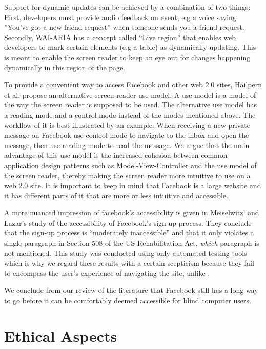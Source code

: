 \documentclass[conference]{IEEEtran}
\begin{document}
Support for dynamic updates can be achieved by a combination of two things\cite{hailpern2009}: First, developers must provide audio feedback on event, e.g a voice saying ''You've got a new friend request'' when someone sends you a friend request. Secondly, WAI-ARIA has a concept called ``Live region''\cite{ariaspec} that enables web developers to mark certain elements (e.g a table) as dynamically updating. This is meant to enable the screen reader to keep an eye out for changes happening dynamically in this region of the page.

To provide a convenient way to access Facebook and other web 2.0 sites, Hailpern et al\cite{hailpern2009}. propose an alternative screen reader use model. A use model is a model of the way the screen reader is supposed to be used. The alternative use model has a reading mode and a control mode instead of the modes mentioned above. The workflow of it is best illustrated by an example: When receiving a new private message on Facebook use control mode to navigate to the inbox and open the message, then use reading mode to read the message. We argue that the main advantage of this use model is the increased cohesion between common application design patterns such as Model-View-Controller and the use model of the screen reader, thereby making the screen reader more intuitive to use on a web 2.0 site. It is important to keep in mind that Facebook is a large website and it has different parts of it that are more or less intuitive and accessible.

A more nuanced impression of facebook's accessibility is given in Meiselwitz' and Lazar's \cite{meiselwitz2009} study of the accessibility of Facebook's sign-up process. They conclude that the sign-up process is ``moderately inaccessible'' and that it only violates a single paragraph in Section 508 of the US Rehabilitation Act, \emph{which} paragraph is not mentioned. This study was conducted using only automated testing tools which is why we regard these results with a certain scepticism because they fail to encompass the user's experience of navigating the site, unlike \cite{buzzi2010}.

We conclude from our review of the literature that Facebook still has a long way to go before it can be comfortably deemed accessible for blind computer users.

\section{Ethical Aspects}
\label{ethics}
\end{document}
